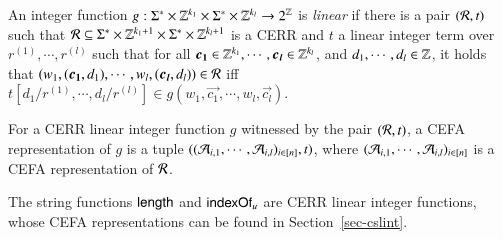

\begin{definition}
An integer function $g: \Sigma^* \times \mathbb{Z}^{k_1} \times \Sigma^* \times \mathbb{Z}^{k_l} \rightarrow 2^{\mathbb{Z}}$ is  \emph{linear} if there is a pair $(\mathcal{R}, t)$ such that $\mathcal{R} \subseteq \Sigma^* \times \mathbb{Z}^{k_1+1} \times \Sigma^* \times \mathbb{Z}^{k_l+1}$ is a CERR and $t$ a linear integer term over $r^{(1)}, \cdots, r^{(l)}$ such that for all $\vec{c_1} \in \intnum^{k_1}, \cdots, \vec{c_l} \in \intnum^{k_l}$, and $d_1, \cdots, d_l \in \mathbb{Z}$, it holds that $(w_1, (\vec{c_1}, d_1), \cdots, w_l, (\vec{c_l}, d_l)) \in \cR$ iff $t[d_1/r^{(1)}, \cdots, d_l/r^{(l)}] \in g(w_1, \vec{c_1}, \cdots, w_l, \vec{c_l})$.  

For a CERR linear integer function $g$ witnessed by the pair $(\mathcal{R}, t)$, a CEFA representation of $g$ is a tuple $((\mathcal{A}_{i,1}, \cdots, \mathcal{A}_{i, l})_{i \in [n]}, t)$, where $(\mathcal{A}_{i,1}, \cdots, \mathcal{A}_{i, l})_{i \in [n]}$ is a CEFA representation of $\mathcal{R}$.

\end{definition}

\begin{example}
The string functions $\mathsf{length}$ and $\mathsf{indexOf}_u$ are CERR linear integer functions, whose CEFA representations can be found in Section~\ref{sec-cslint}.
\end{example}

